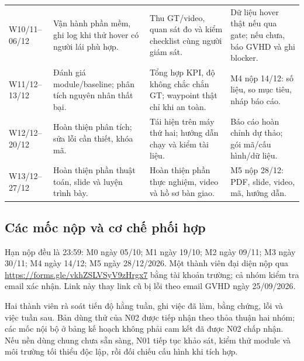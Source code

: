 \documentclass[a4paper,12pt]{article}
\begin{document}
\begin{longtable}{L{1.8cm}L{4.1cm}L{4.1cm}L{3.7cm}}
W10/11--06/12 & Vận hành phần mềm, ghi log khi thử hover có người lái phù hợp. & Thu GT/video, quan sát đo và kiểm checklist cùng người giám sát. & Dữ liệu hover thật nếu qua gate; nếu chưa, báo GVHD và ghi blocker.\\
W11/12--13/12 & Đánh giá module/baseline; phân tích nguyên nhân thất bại. & Tổng hợp KPI, độ không chắc chắn GT; waypoint thật chỉ khi an toàn. & M4 nộp 14/12: số liệu, so mục tiêu, nháp báo cáo.\\
W12/12--20/12 & Hoàn thiện phân tích; sửa lỗi cần thiết, khóa mã. & Tái hiện trên máy thứ hai; hướng dẫn chạy và kiểm tài liệu. & Báo cáo hoàn chỉnh dự thảo; gói mã/cấu hình/dữ liệu.\\
W13/12--27/12 & Hoàn thiện phần thuật toán, slide và luyện trình bày. & Hoàn thiện phần thực nghiệm, video và hồ sơ bàn giao. & M5 nộp 28/12: PDF, slide, video, mã, hướng dẫn.\\
\bottomrule
\end{longtable}\endgroup

\subsection{Các mốc nộp và cơ chế phối hợp}
Hạn nộp đều là 23:59: M0 ngày 05/10; M1 ngày 19/10; M2 ngày 09/11; M3 ngày 30/11; M4 ngày 14/12; M5 ngày 28/12/2026\cite{assignment}. Một thành viên đại diện nộp qua \url{https://forms.gle/vkhZSLVSyV9zHrgx7} bằng tài khoản trường; cả nhóm kiểm tra email xác nhận. Link này thay link cũ bị lỗi theo email GVHD ngày 25/09/2026\cite{formmail}.

Hai thành viên rà soát tiến độ hằng tuần, ghi việc đã làm, bằng chứng, lỗi và việc tuần sau. Bản dùng thử của N02 được tiếp nhận theo thỏa thuận hai nhóm; các mốc nội bộ ở bảng kế hoạch không phải cam kết đã được N02 chấp nhận. Nếu nền dùng chung chưa sẵn sàng, N01 tiếp tục khảo sát, kiểm thử module và môi trường tối thiểu độc lập, rồi đối chiếu cấu hình khi tích hợp.
\end{document}
